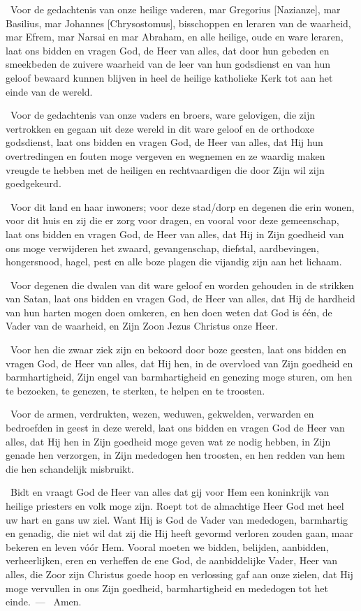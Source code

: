 \documentclass[12pt,twoside,a5paper]{article}
\begin{document}
\begin{halfparskip}
  \dd~Voor de gedachtenis van onze heilige vaderen, mar Gregorius [Nazianze], mar Basilius, mar Johannes [Chrysostomus], bisschoppen en leraren van de waarheid, mar Efrem, mar Narsai en mar Abraham, en alle heilige, oude en ware leraren, laat ons bidden en vragen God, de Heer van alles, dat door hun gebeden en smeekbeden de zuivere waarheid van de leer van hun godsdienst en van hun geloof bewaard kunnen blijven in heel de heilige katholieke Kerk tot aan het einde van de wereld.

  \dd~Voor de gedachtenis van onze vaders en broers, ware gelovigen, die zijn vertrokken en gegaan uit deze wereld in dit ware geloof en de orthodoxe godsdienst, laat ons bidden en vragen God, de Heer van alles, dat Hij hun overtredingen en fouten moge vergeven en wegnemen en ze waardig maken vreugde te hebben met de heiligen en rechtvaardigen die door Zijn wil zijn goedgekeurd.

  \dd~Voor dit land en haar inwoners; voor deze stad/dorp en degenen die erin wonen, voor dit huis en zij die er zorg voor dragen, en vooral voor deze gemeenschap, laat ons bidden en vragen God, de Heer van alles, dat Hij in Zijn goedheid van ons moge verwijderen het zwaard, gevangenschap, diefstal, aardbevingen, hongersnood, hagel, pest en alle boze plagen die vijandig zijn aan het lichaam.

  \dd~Voor degenen die dwalen van dit ware geloof en worden gehouden in de strikken van Satan, laat ons bidden en vragen God, de Heer van alles, dat Hij de hardheid van hun harten mogen doen omkeren, en hen doen weten dat God is één, de Vader van de waarheid, en Zijn Zoon Jezus Christus onze Heer.

  \dd~Voor hen die zwaar ziek zijn en bekoord door boze geesten, laat ons bidden en vragen God, de Heer van alles, dat Hij hen, in de overvloed van Zijn goedheid en barmhartigheid, Zijn engel van barmhartigheid en genezing moge sturen, om hen te bezoeken, te genezen, te sterken, te helpen en te troosten.

  \dd~Voor de armen, verdrukten, wezen, weduwen, gekwelden, verwarden en bedroefden in geest in deze wereld, laat ons bidden en vragen God de Heer van alles, dat Hij hen in Zijn goedheid moge geven wat ze nodig hebben, in Zijn genade hen verzorgen, in Zijn mededogen hen troosten, en hen redden van hem die hen schandelijk misbruikt.

  \dd~Bidt en vraagt God de Heer van alles dat gij voor Hem een koninkrijk van heilige priesters en volk moge zijn. Roept tot de almachtige Heer God met heel uw hart en gans uw ziel. Want Hij is God de Vader van mededogen, barmhartig en genadig, die niet wil dat zij die Hij heeft gevormd verloren zouden gaan, maar bekeren en leven vóór Hem. Vooral moeten we bidden, belijden, aanbidden, verheerlijken, eren en verheffen de ene God, de aanbiddelijke Vader, Heer van alles, die Zoor zijn Christus goede hoop en verlossing gaf aan onze zielen, dat Hij moge vervullen in ons Zijn goedheid, barmhartigheid en mededogen tot het einde.~--- \rr~Amen.\liturgicalRbracket
\end{halfparskip}
\end{document}
